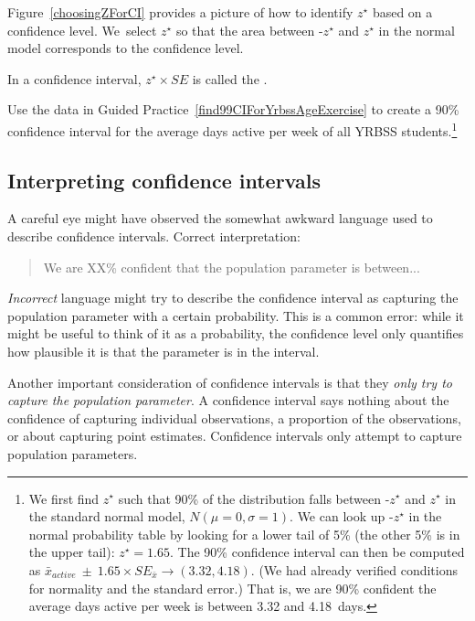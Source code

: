 Figure~\ref{choosingZForCI} provides a picture of how to identify $z^{\star}$ based on a confidence level. We~select $z^{\star}$ so that the area between -$z^{\star}$ and $z^{\star}$ in the normal model corresponds to the confidence level. 

\begin{termBox}{
\label{marginOfErrorTermBox}In a confidence interval, $z^{\star}\times SE$ is called the .}
\end{termBox}

\begin{exercise} \label{find90CIForYrbssAgeExercise}
Use the data in Guided Practice~\ref{find99CIForYrbssAgeExercise} to create a 90\% confidence interval for the average days active per week of all YRBSS students.\footnote{We first find $z^{\star}$ such that 90\% of the distribution falls between -$z^{\star}$ and $z^{\star}$ in the standard normal model, $N(\mu=0, \sigma=1)$. We can look up -$z^{\star}$ in the normal probability table by looking for a lower tail of 5\% (the other 5\% is in the upper tail): $z^{\star}=1.65$. The 90\% confidence interval can then be computed as $\bar{x}_{active}\ \pm\ 1.65\times SE_{\bar{x}} \to (3.32, 4.18)$. (We had already verified conditions for normality and the standard error.) That is, we are 90\% confident the average days active per week is between 3.32 and 4.18~days.}
\end{exercise}

\subsection{Interpreting confidence intervals}
\label{interpretingCIs}


A careful eye might have observed the somewhat awkward language used to describe confidence intervals. Correct interpretation:
\begin{quote}
We are XX\% confident that the population parameter is between...
\end{quote}
\emph{Incorrect} language might try to describe the confidence interval as capturing the population parameter with a certain probability. This is a common error: while it might be useful to think of it as a probability, the confidence level only quantifies how plausible it is that the parameter is in the interval.

Another important consideration of confidence intervals is that they \emph{only try to capture the population parameter}. A confidence interval says nothing about the confidence of capturing individual observations, a proportion of the observations, or about capturing point estimates. Confidence intervals only attempt to capture population parameters.

